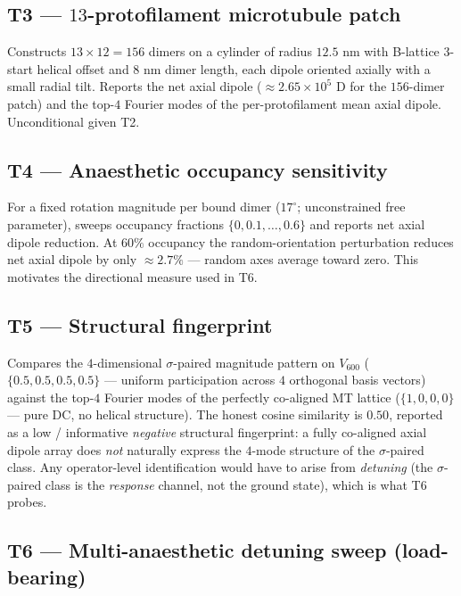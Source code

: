 \documentclass[11pt,a4paper]{article}
\begin{document}
\subsection{\textsf{T3} --- $13$-protofilament microtubule patch}
Constructs $13 \times 12 = 156$ dimers on a cylinder of radius
$12.5$ nm with B-lattice $3$-start helical offset and $8$ nm dimer
length, each dipole oriented axially with a small radial tilt. Reports
the net axial dipole ($\approx 2.65 \times 10^5$ D for the $156$-dimer
patch) and the top-$4$ Fourier modes of the per-protofilament mean
axial dipole. Unconditional given \textsf{T2}.

\subsection{\textsf{T4} --- Anaesthetic occupancy sensitivity}
For a fixed rotation magnitude per bound dimer ($17^\circ$;
unconstrained free parameter), sweeps occupancy fractions
$\{0, 0.1, \dots, 0.6\}$ and reports net axial dipole reduction. At
$60\%$ occupancy the random-orientation perturbation reduces net axial
dipole by only $\approx 2.7\%$ --- random axes average toward zero.
This motivates the directional measure used in \textsf{T6}.

\subsection{\textsf{T5} --- Structural fingerprint}
Compares the $4$-dimensional $\sigma$-paired magnitude pattern on $V_{600}$
($\{0.5,0.5,0.5,0.5\}$ --- uniform participation across $4$ orthogonal
basis vectors) against the top-$4$ Fourier modes of the perfectly
co-aligned MT lattice ($\{1,0,0,0\}$ --- pure DC, no helical structure).
The honest cosine similarity is $0.50$, reported as a low / informative
\emph{negative} structural fingerprint: a fully co-aligned axial dipole
array does \emph{not} naturally express the $4$-mode structure of the
$\sigma$-paired class. Any operator-level identification would have to
arise from \emph{detuning} (the $\sigma$-paired class is the
\emph{response} channel, not the ground state), which is what
\textsf{T6} probes.

\subsection{\textsf{T6} --- Multi-anaesthetic detuning sweep (load-bearing)}\label{ssec:t6}
\end{document}
